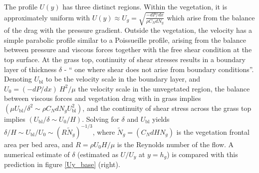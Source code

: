 \documentclass[12pt]{report}   %
\newcommand{\hg}{h_g}
\newcommand{\Rey}{{R}}
\newcommand{\Ndg}{\tilde{N}_g}
\newcommand{\ubl}{U_\text{bl}}
\begin{document}
The profile $U(y)$ has three distinct regions.
Within the vegetation, it is approximately uniform with $ U(y) \approx U_g = \sqrt{\frac{-dP/dx}{\rho C_N dN_g}}$ which arise from the balance of the drag with the pressure gradient. 
Outside the vegetation, the velocity has a simple parabolic profile similar to a Poissueille profile, arising from the balance between pressure and viscous forces together with the free shear condition at the top surface. 
At the grass top, continuity of shear stresses results in a boundary layer of thickness $\delta$ - `` one where shear does not arise from boundary conditions''. Denoting $\ubl$ to be the velocity scale in the boundary layer, and $U_0 = {(-dP/dx)~H^2}/{\mu}$ the velocity scale in the unvegetated region, the balance between viscous forces and vegetation drag with in grass implies $(\mu \ubl/\delta^2 \sim \rho C_N d N_g \ubl^2)$, and the continuity of shear stress across the grass top implies $(\ubl/\delta \sim U_0/H)$.
Solving for $\delta$ and $\ubl$ yields $\delta/H \sim \ubl/U_0 \sim (\Rey \Ndg )^{-1/3}$, where $\Ndg = \left(C_N d H N_g\right)$ is the vegetation frontal area per bed area, and $\Rey=\rho U_0 H/\mu$ is the Reynolds number of the flow. 
A numerical estimate of $\delta$ (estimated as $U/U_y$ at $y=\hg$) is compared with this prediction in figure \ref{Uy_base} (right).
\end{document}
